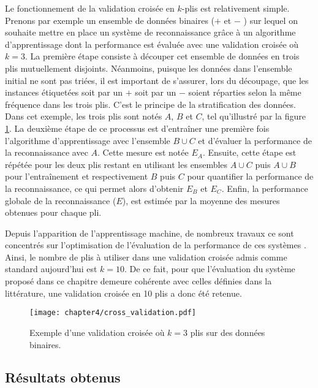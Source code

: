 Le fonctionnement de la validation croisée en $k$-plis est relativement simple. Prenons par exemple un ensemble de données binaires (\og $+$ \fg et \og $-$ \fg) sur lequel on souhaite mettre en place un système de reconnaissance grâce à un algorithme d'apprentissage dont la performance est évaluée avec une validation croisée où $k=3$. La première étape consiste à découper cet ensemble de données en trois plis mutuellement disjoints. Néanmoins, puisque les données dans l'ensemble initial ne sont pas triées, il est important de s'assurer, lors du découpage, que les instances étiquetées soit par un \og $+$ \fg soit par un \og $-$ \fg soient réparties selon la même fréquence dans les trois plis. C'est le principe de la stratification des données. Dans cet exemple, les trois plis sont notés $A$, $B$ et $C$, tel qu'illustré par la figure \ref{fig:cross_validation}. La deuxième étape de ce processus est d'entraîner une première fois l'algorithme d'apprentissage avec l'ensemble $B\cup C$ et d'évaluer la performance de la reconnaissance avec $A$. Cette mesure est notée $E_A$. Ensuite, cette étape est répétée pour les deux plis restant en utilisant les ensembles $A\cup C$ puis $A\cup B$ pour l'entraînement et respectivement $B$ puis $C$ pour quantifier la performance de la reconnaissance, ce qui permet alors d'obtenir $E_B$ et $E_C$. Enfin, la performance globale de la reconnaissance ($E$), est estimée par la moyenne des mesures obtenues pour chaque pli.

Depuis l'apparition de l'apprentissage machine, de nombreux travaux ce sont concentrés sur l'optimisation de l'évaluation de la performance de ces systèmes \citep{Witten2016}. Ainsi, le nombre de plis à utiliser dans une validation croisée admis comme standard aujourd'hui est $k=10$. De ce fait, pour que l'évaluation du système proposé dans ce chapitre demeure cohérente avec celles définies dans la littérature, une validation croisée en 10 plis a donc été retenue.

\begin{figure}[H]
	\centering
	\texttt{[image: chapter4/cross\_validation.pdf]}
        \caption{Exemple d'une validation croisée où $k=3$ plis sur des données binaires.}
	\label{fig:cross_validation}
\end{figure}

\subsection{Résultats obtenus}

